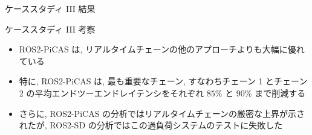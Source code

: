 \begin{frame}{ケーススタディ III 結果}
\end{frame}

\begin{frame}{ケーススタディ III 考察}
    \begin{itemize}
        \item ROS2-PiCAS は, リアルタイムチェーンの他のアプローチよりも大幅に優れている
        \item 特に, ROS2-PiCAS は, 最も重要なチェーン, すなわちチェーン 1 とチェーン 2 の平均エンドツーエンドレイテンシをそれぞれ $85 \%$ と $90 \%$ まで削減する
        \item さらに, ROS2-PiCAS の分析ではリアルタイムチェーンの厳密な上界が示されたが, ROS2-SD の分析ではこの過負荷システムのテストに失敗した
    \end{itemize}
\end{frame}






